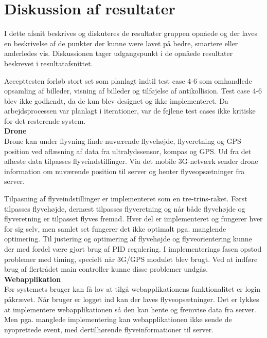 \section{Diskussion af resultater}

I dette afsnit beskrives og diskuteres de resultater gruppen opnåede og der laves en beskrivelse af de punkter der kunne være lavet på bedre, smartere eller anderledes vis. Diskussionen tager udgangspunkt i de opnåede resultater beskrevet i resultatafsnittet.

Accepttesten forløb stort set som planlagt indtil test case 4-6 som omhandlede opsamling af billeder, visning af billeder og tilføjelse af antikollision. Test case 4-6 blev ikke godkendt, da de kun blev designet og ikke implementeret. Da arbejdsprocessen var planlagt i iterationer, var de fejlene test cases ikke kritiske for det resterende system.\\

\textbf{Drone}\\
Drone kan under flyvning finde nuværende flyvehøjde, flyveretning og GPS position ved aflæsning af data fra ultralydssensor, kompas og GPS.  Ud fra det aflæste data tilpasses flyveindstillinger. Via det mobile 3G-netværk sender drone information om nuværende position til server og henter flyveopsætninger fra server.

Tilpasning af flyveindstillinger er implementeret som en tre-trins-raket. Først tilpasses flyvehøjde, dernæst tilpasses flyveretning og når både flyvehøjde og flyveretning er tilpasset flyves fremad. Hver del er implementeret og fungerer hver for sig selv, men samlet set fungerer det ikke optimalt pga. manglende optimering. Til justering og optimering af flyvehøjde og flyveorientering kunne der med fordel være gjort brug af PID regulering.  I implementerings fasen opstod problemer med timing, specielt når 3G/GPS modulet blev brugt. Ved at indføre brug af flertrådet main controller kunne disse problemer undgås. \\

\textbf{Webapplikation}\\
Før systemets bruger kan få lov at tilgå webapplikationens funktionalitet er login påkrævet. Når bruger er logget ind kan der laves flyveopsætninger. Det er lykkes at implementere webapplikationen så den kan hente og fremvise data fra server. 
Men pga. manglede implementering kan webapplikationen ikke sende de nyoprettede event, med dertilhørende flyveinformationer til server.\\


